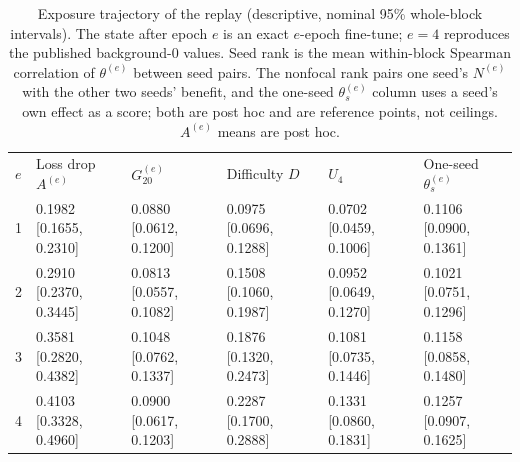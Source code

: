 \begin{table}[tp]
{\begin{tabular}{@{}llllll@{}}
$e$ & Loss drop $A^{(e)}$ & $G_{20}^{(e)}$ & Difficulty $D$ & $U_4$ & One-seed $\theta^{(e)}_s$ \\
1 & 0.1982 [0.1655, 0.2310] & 0.0880 [0.0612, 0.1200] & 0.0975 [0.0696, 0.1288] & 0.0702 [0.0459, 0.1006] & 0.1106 [0.0900, 0.1361] \\
2 & 0.2910 [0.2370, 0.3445] & 0.0813 [0.0557, 0.1082] & 0.1508 [0.1060, 0.1987] & 0.0952 [0.0649, 0.1270] & 0.1021 [0.0751, 0.1296] \\
3 & 0.3581 [0.2820, 0.4382] & 0.1048 [0.0762, 0.1337] & 0.1876 [0.1320, 0.2473] & 0.1081 [0.0735, 0.1446] & 0.1158 [0.0858, 0.1480] \\
4 & 0.4103 [0.3328, 0.4960] & 0.0900 [0.0617, 0.1203] & 0.2287 [0.1700, 0.2888] & 0.1331 [0.0860, 0.1831] & 0.1257 [0.0907, 0.1625] \\
\bottomrule
\end{tabular}}
\caption{Exposure trajectory of the replay (descriptive, nominal 95\% whole-block intervals). The state after epoch $e$ is an exact $e$-epoch fine-tune; $e=4$ reproduces the published background-0 values. Seed rank is the mean within-block Spearman correlation of $\theta^{(e)}$ between seed pairs. The nonfocal rank pairs one seed's $N^{(e)}$ with the other two seeds' benefit, and the one-seed $\theta^{(e)}_s$ column uses a seed's own effect as a score; both are post hoc and are reference points, not ceilings. $A^{(e)}$ means are post hoc.}
\label{tab:e06_exposure}
\end{table}
